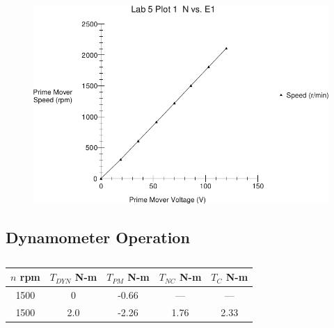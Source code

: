 \documentclass{article}
\begin{document}
\begin{figure}[H]
  \centering
  \includegraphics[width=\textwidth]{img/plot1}
  \caption{}
  \label{}
\end{figure}

\subsection{Dynamometer Operation}

\begin{table}[H]
  \centering
  \begin{tabular}{*{5}{c}}
    $n$ rpm & $T_{DYN}$ N-m& $T_{PM}$ N-m & $T_{NC}$ N-m & $T_C$ N-m \\
    \hline
    1500 &   0 & -0.66 &  --- &  --- \\
    1500 & 2.0 & -2.26 & 1.76 & 2.33 \\
  \end{tabular}
  \caption{}
  \label{}
\end{table}
\end{document}
